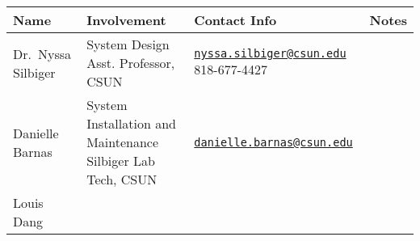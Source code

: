 \documentclass[]{book}
\begin{document}
\begin{longtable}[]{@{}llll@{}}
\toprule
\begin{minipage}[b]{0.06\columnwidth}\raggedright\strut
Name\strut
\end{minipage} & \begin{minipage}[b]{0.06\columnwidth}\raggedright\strut
Involvement\strut
\end{minipage} & \begin{minipage}[b]{0.06\columnwidth}\raggedright\strut
Contact Info\strut
\end{minipage} & \begin{minipage}[b]{0.06\columnwidth}\raggedright\strut
Notes\strut
\end{minipage}\tabularnewline
\midrule
\endhead
\begin{minipage}[t]{0.06\columnwidth}\raggedright\strut
Dr.~Nyssa Silbiger\strut
\end{minipage} & \begin{minipage}[t]{0.06\columnwidth}\raggedright\strut
System Design Asst. Professor, CSUN\strut
\end{minipage} & \begin{minipage}[t]{0.06\columnwidth}\raggedright\strut
\href{mailto:nyssa.silbiger@csun.edu}{\nolinkurl{nyssa.silbiger@csun.edu}}
818-677-4427\strut
\end{minipage} & \begin{minipage}[t]{0.06\columnwidth}\raggedright\strut
\strut
\end{minipage}\tabularnewline
\begin{minipage}[t]{0.06\columnwidth}\raggedright\strut
Danielle Barnas\strut
\end{minipage} & \begin{minipage}[t]{0.06\columnwidth}\raggedright\strut
System Installation and Maintenance Silbiger Lab Tech, CSUN\strut
\end{minipage} & \begin{minipage}[t]{0.06\columnwidth}\raggedright\strut
\href{mailto:danielle.barnas@csun.edu}{\nolinkurl{danielle.barnas@csun.edu}}\strut
\end{minipage} & \begin{minipage}[t]{0.06\columnwidth}\raggedright\strut
\strut
\end{minipage}\tabularnewline
\begin{minipage}[t]{0.06\columnwidth}\raggedright\strut
Louis Dang\strut
\end{minipage} & \begin{minipage}[t]{0.06\columnwidth}\raggedright\strut

\end{minipage}
\end{longtable}
\end{document}
